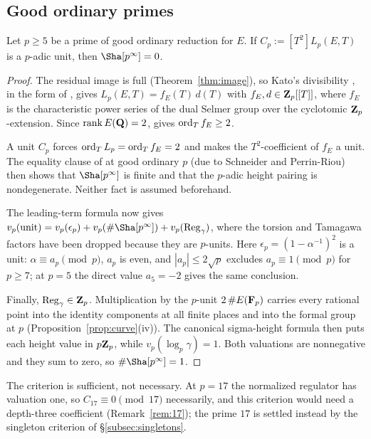 \subsection{Good ordinary primes}
\begin{lemma}\label{lem:goodord}
Let $p\ge5$ be a prime of good ordinary reduction for $E$. If $C_p:=[T^2]L_p(E,T)$ is a $p$-adic unit, then $\Sha[p^\infty]=0$.
\end{lemma}
\begin{proof}
The residual image is full (Theorem~\ref{thm:image}), so Kato's divisibility \cite{kato}, in the form of \cite[Thm.~7.3]{sw}, gives $L_p(E,T)=f_E(T)\,d(T)$ with $f_E,d\in\mathbf{Z}_p[[T]]$, where $f_E$ is the characteristic power series of the dual Selmer group over the cyclotomic $\mathbf{Z}_p$-extension. Since $\operatorname{rank} E(\mathbf{Q})=2$, \cite[Thm.~6.1]{sw} gives $\operatorname{ord}_Tf_E\ge2$.

A unit $C_p$ forces $\operatorname{ord}_TL_p=\operatorname{ord}_Tf_E=2$ and makes the $T^2$-coefficient of $f_E$ a unit. The equality clause of \cite[Thm.~6.1]{sw} at good ordinary $p$ (due to Schneider and Perrin-Riou) then shows that $\Sha[p^\infty]$ is finite and that the $p$-adic height pairing is nondegenerate. Neither fact is assumed beforehand.

The leading-term formula now gives $v_p(\text{unit})=v_p(\epsilon_p)+v_p(\#\Sha[p^\infty])+v_p(\Reg_\gamma)$, where the torsion and Tamagawa factors have been dropped because they are $p$-units. Here $\epsilon_p=(1-\alpha^{-1})^2$ is a unit: $\alpha\equiv a_p\pmod p$, $a_p$ is even, and $|a_p|\le2\sqrt p$ excludes $a_p\equiv1\pmod p$ for $p\ge7$; at $p=5$ the direct value $a_5=-2$ gives the same conclusion.

Finally, $\operatorname{Reg}_\gamma\in\mathbf{Z}_p$. Multiplication by the $p$-unit $2\,\#E(\mathbf{F}_p)$ carries every rational point into the identity components at all finite places and into the formal group at $p$ (Proposition~\ref{prop:curve}(iv)). The canonical sigma-height formula \cite[\S4.1]{sw} then puts each height value in $p\mathbf{Z}_p$, while $v_p(\log_p\gamma)=1$. Both valuations are nonnegative and they sum to zero, so $\#\Sha[p^\infty]=1$.
\end{proof}
The criterion is sufficient, not necessary. At $p=17$ the normalized regulator has valuation one, so $C_{17}\equiv0\pmod{17}$ necessarily, and this criterion would need a depth-three coefficient (Remark~\ref{rem:17}); the prime $17$ is settled instead by the singleton criterion of \S\ref{subsec:singletons}.

